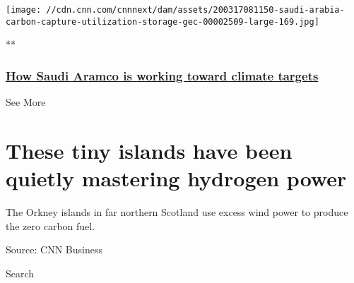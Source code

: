 \href{/videos/business/2020/03/17/saudi-arabia-carbon-capture-utilization-storage-gec.cnn-business/video/playlists/business-global-energy-challenge/}{}

\texttt{[image: //cdn.cnn.com/cnnnext/dam/assets/200317081150-saudi-arabia-carbon-capture-utilization-storage-gec-00002509-large-169.jpg]}

**

\hypertarget{how-saudi-aramco-is-working-toward-climate-targets}{%
\subsubsection{\texorpdfstring{\href{/videos/business/2020/03/17/saudi-arabia-carbon-capture-utilization-storage-gec.cnn-business/video/playlists/business-global-energy-challenge/}{How
Saudi Aramco is working toward climate
targets}}{How Saudi Aramco is working toward climate targets}}\label{how-saudi-aramco-is-working-toward-climate-targets}}

See More

\hypertarget{these-tiny-islands-have-been-quietly-mastering-hydrogen-power-2}{%
\section{These tiny islands have been quietly mastering hydrogen
power}\label{these-tiny-islands-have-been-quietly-mastering-hydrogen-power-2}}

The Orkney islands in far northern Scotland use excess wind power to
produce the zero carbon fuel.

Source: CNN Business

Search

